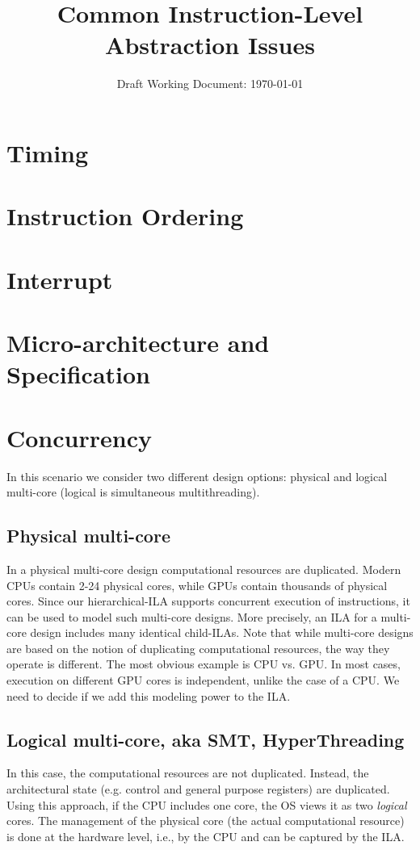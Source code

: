 \documentclass[letterpaper, 11 pt]{article}  %
\title{Common Instruction-Level Abstraction Issues}
\author{}
\date{Draft Working Document: \today}
\begin{document}
\maketitle

\providecommand{\bd}[0]{\mathbb{B}}
\providecommand{\st}[1]{\mathrm{#1}}
\providecommand{\ft}[1]{\mathtt{#1}}

\section*{Timing}

\section*{Instruction Ordering}

\section*{Interrupt}

\section*{Micro-architecture and Specification}

\section*{Concurrency}

In this scenario we consider two different design options: physical and logical multi-core (logical is simultaneous multithreading). 
\subsection*{Physical multi-core} 
In a physical multi-core design computational resources are duplicated. Modern CPUs contain 2-24 physical cores, while GPUs contain thousands of physical cores. Since our hierarchical-ILA supports concurrent execution of instructions, it can be used to model such multi-core designs. More precisely, an ILA for a multi-core design includes many identical child-ILAs. Note that while multi-core designs are based on the notion of duplicating computational resources, the way they operate is different. The most obvious example is CPU vs. GPU. In most cases, execution on different GPU cores is independent, unlike the case of a CPU. We need to decide if we add this modeling power to the ILA.

\subsection*{Logical multi-core, aka SMT, HyperThreading}
In this case, the computational resources are not duplicated. Instead, the architectural state (e.g. control and general purpose registers) are duplicated. Using this approach, if the CPU includes one core, the OS views it as two \emph{logical} cores. The management of the physical core (the actual computational resource) is done at the hardware level, i.e., by the CPU and can be captured by the ILA.

%
%
\end{document}
